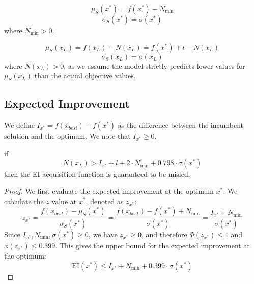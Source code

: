 {
\begin{equation*}
    \mu_S(x^*) = f(x^*) - N_{\min}
\end{equation*}
\begin{equation*}
    \sigma_S(x^*) = \sigma(x^*)
\end{equation*}
where $N_{\min} > 0$.

\begin{equation*}
    \mu_S(x_L) = f(x_L) - N(x_L) = f(x^*) + l - N(x_L)
\end{equation*}
\begin{equation*}
    \sigma_S(x_L) = \sigma(x_L)
\end{equation*}
where $N(x_L) > 0$, as we assume the model strictly predicts lower values for $\mu_S(x_L)$ than the actual objective values.

\subsection{Expected Improvement}
We define $I_{x^*} = f(x_{best}) - f(x^*)$ as the difference between the incumbent solution and the optimum. We note that $I_{x^*} \ge 0$.

\begin{theorem}
if
\begin{equation*}
    N(x_L) > I_{x^*} + l + 2 \cdot N_{\min} + 0.798 \cdot \sigma(x^*)
\end{equation*}
then the EI acquisition function is guaranteed to be misled.
\end{theorem}

\begin{proof}
We first evaluate the expected improvement at the optimum $x^*$. We calculate the $z$ value at $x^*$, denoted as $z_{x^*}$:
\begin{equation}
    \label{eq:z_xstar}
    z_{x^*} = \frac{f(x_{best}) - \mu_S(x^*)}{\sigma_S(x^*)} = \frac{f(x_{best}) - f(x^*)+ N_{\min}}{\sigma(x^*)}=\frac{I_{x^*} + N_{\min}}{\sigma(x^*)}
\end{equation}
Since $I_{x^*},N_{\min},\sigma(x^*) \ge 0$, we have $z_{x^*} \ge 0$, and therefore $\Phi(z_{x^*}) \le 1$ and $\phi(z_{x^*}) \le 0.399$. This gives the upper bound for the expected improvement at the optimum:
\begin{equation}
    \label{eq:EI_star_bound}
    \mathrm{EI}(x^*) \le I_{x^*} + N_{\min} + 0.399 \cdot \sigma(x^*)
\end{equation}


\end{proof}}
